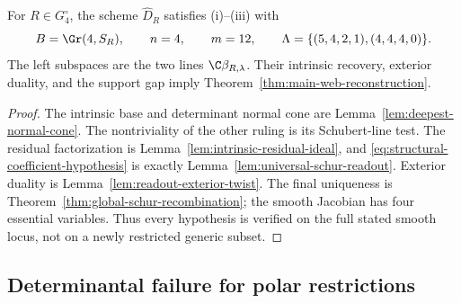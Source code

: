 \begin{corollary}
\label{cor:structural-web-instance}
For \(R\in G_4^\circ\), the scheme \(\widehat D_R\) satisfies
\textup{(i)--(iii)} with
\[
 B=\Gr(4,S_R),\qquad n=4,\qquad m=12,\qquad
 \Lambda=\{(5,4,2,1),(4,4,4,0)\}.
\]
The left subspaces are the two lines
\(\C\beta_{R,\lambda}\).  Their intrinsic recovery, exterior
duality, and the support gap imply Theorem~\ref{thm:main-web-reconstruction}.
\end{corollary}
\begin{proof}
The intrinsic base and determinant normal cone are
Lemma~\ref{lem:deepest-normal-cone}.  The nontriviality of the other
ruling is its Schubert-line test.  The residual factorization is
Lemma~\ref{lem:intrinsic-residual-ideal}, and
\eqref{eq:structural-coefficient-hypothesis} is exactly
Lemma~\ref{lem:universal-schur-readout}.  Exterior duality is
Lemma~\ref{lem:readout-exterior-twist}.  The final uniqueness is
Theorem~\ref{thm:global-schur-recombination}; the smooth Jacobian
has four essential variables.  Thus every hypothesis is verified on
the full stated smooth locus, not on a newly restricted generic subset.
\end{proof}

\subsection{Determinantal failure for polar restrictions}

